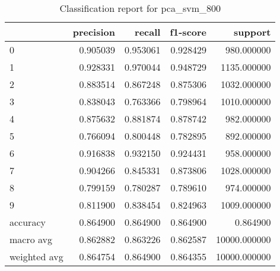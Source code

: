\begin{table}[htb!]
\centering
\caption{Classification report for pca_svm_800}
\label{tab:classification-report-pca_svm_800}
\begin{tabular}{lrrrr}
\toprule
 & precision & recall & f1-score & support \\
\midrule
0 & 0.905039 & 0.953061 & 0.928429 & 980.000000 \\
1 & 0.928331 & 0.970044 & 0.948729 & 1135.000000 \\
2 & 0.883514 & 0.867248 & 0.875306 & 1032.000000 \\
3 & 0.838043 & 0.763366 & 0.798964 & 1010.000000 \\
4 & 0.875632 & 0.881874 & 0.878742 & 982.000000 \\
5 & 0.766094 & 0.800448 & 0.782895 & 892.000000 \\
6 & 0.916838 & 0.932150 & 0.924431 & 958.000000 \\
7 & 0.904266 & 0.845331 & 0.873806 & 1028.000000 \\
8 & 0.799159 & 0.780287 & 0.789610 & 974.000000 \\
9 & 0.811900 & 0.838454 & 0.824963 & 1009.000000 \\
accuracy & 0.864900 & 0.864900 & 0.864900 & 0.864900 \\
macro avg & 0.862882 & 0.863226 & 0.862587 & 10000.000000 \\
weighted avg & 0.864754 & 0.864900 & 0.864355 & 10000.000000 \\
\bottomrule
\end{tabular}
\end{table}
